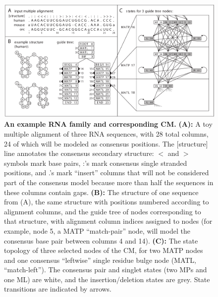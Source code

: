 \begin{figure}
\begin{center}
\includegraphics[width=6.4in]{figs/cmintro_bandcyk}
\caption{\textbf{An example RNA family and corresponding CM.}
  \textbf{(A):} A toy multiple alignment of three RNA sequences, with
  28 total columns, 24 of which will be modeled as consensus
  positions. The [structure] line annotates the consensus secondary
  structure: $<$ and $>$ symbols mark base pairs, :'s mark consensus
  single stranded positions, and .'s mark ``insert'' columns that will
  not be considered part of the consensus model because more than half
  the sequences in these columns contain gaps.  \textbf{(B):} The
  structure of one sequence from (A), the same structure with
  positions numbered according to alignment columns, and the guide
  tree of nodes corresponding to that structure, with alignment column
  indices assigned to nodes (for example, node 5, a MATP
  ``match-pair'' node, will model the consensus base pair between
  columns 4 and 14). \textbf{(C):} The state topology of three
  selected nodes of the CM, for two MATP nodes and one consensus
  ``leftwise'' single residue bulge node (MATL, ``match-left'').  The
  consensus pair and singlet states (two MPs and one ML) are white,
  and the insertion/deletion states are grey. State transitions are
  indicated by arrows.}
\label{fig:cmintro}
\end{center}
\end{figure}
